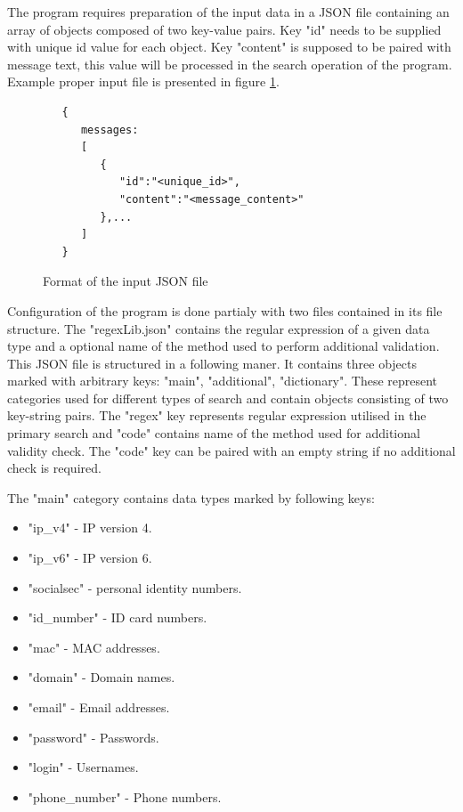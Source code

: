 \documentclass[a4paper,twoside,12pt]{book}
\begin{document}
The program requires preparation of the input data in a JSON file containing
an array of objects composed of two key-value pairs. Key "id" needs to be 
supplied with unique id value for each object. Key "content" is supposed to be 
paired with message text, this value will be processed in the search operation 
of the program. Example proper input file is presented in figure \ref{fig:inputFormat}.

\begin{figure}
   \centering
   \begin{lstlisting}
   {
      messages:
      [
         {
            "id":"<unique_id>",
            "content":"<message_content>"
         },...
      ]
   }
   \end{lstlisting}
   \caption{Format of the input JSON file}
   \label{fig:inputFormat}
\end{figure}

Configuration of the program is done partialy with two files contained in its
file structure. The "regexLib.json" contains the regular expression of a given
data type and a optional name of the method used to perform additional 
validation. This JSON file is structured in a following maner. It contains
three objects marked with arbitrary keys: "main", "additional", "dictionary".
These represent categories used for different types of search and contain
objects consisting of two key-string pairs. The "regex" key represents regular
expression utilised in the primary search and "code" contains name of the method 
used for additional validity check. The "code" key can be paired with an empty string
if no additional check is required.

The "main" category contains data types marked by following keys:

\begin{itemize}
   \item "ip\_v4" - IP version 4.
   \item "ip\_v6" - IP version 6.
   \item "socialsec" - personal identity numbers.
   \item "id\_number" - ID card numbers.
   \item "mac" - MAC addresses.
   \item "domain" - Domain names.
   \item "email" - Email addresses.
   \item "password" - Passwords.
   \item "login" - Usernames.
   \item "phone\_number" - Phone numbers.
\end{itemize} 
\end{document}
